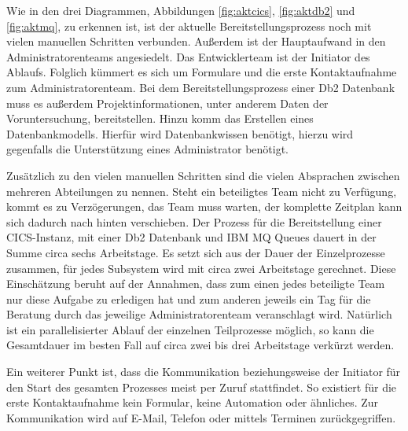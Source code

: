 Wie in den drei Diagrammen, Abbildungen \ref{fig:aktcics}, \ref{fig:aktdb2} und \ref{fig:aktmq}, zu erkennen ist, ist der aktuelle Bereitstellungsprozess noch mit vielen manuellen Schritten verbunden.
Außerdem ist der Hauptaufwand in den Administratorenteams angesiedelt.
Das Entwicklerteam ist der Initiator des Ablaufs.
Folglich kümmert es sich um Formulare und die erste Kontaktaufnahme zum Administratorenteam.
Bei dem Bereitstellungsprozess einer Db2 Datenbank muss es außerdem Projektinformationen, unter anderem Daten der Voruntersuchung, bereitstellen.
Hinzu komm das Erstellen eines Datenbankmodells.
Hierfür wird Datenbankwissen benötigt, hierzu wird gegenfalls die Unterstützung eines Administrator benötigt.

Zusätzlich zu den vielen manuellen Schritten sind die vielen Absprachen zwischen mehreren Abteilungen zu nennen.
Steht ein beteiligtes Team nicht zu Verfügung, kommt es zu Verzögerungen, das Team muss warten, der komplette Zeitplan kann sich dadurch nach hinten verschieben.
Der Prozess für die Bereitstellung einer CICS-Instanz, mit einer Db2 Datenbank und IBM MQ Queues dauert in der Summe circa sechs Arbeitstage.
Es setzt sich aus der Dauer der Einzelprozesse zusammen, für jedes Subsystem wird mit circa zwei Arbeitstage gerechnet.
Diese Einschätzung beruht auf der Annahmen, dass zum einen jedes beteiligte Team nur diese Aufgabe zu erledigen hat und zum anderen jeweils ein Tag für die Beratung durch das jeweilige Administratorenteam veranschlagt wird.
Natürlich ist ein parallelisierter Ablauf der einzelnen Teilprozesse möglich, so kann die Gesamtdauer im besten Fall auf circa zwei bis drei Arbeitstage verkürzt werden.

Ein weiterer Punkt ist, dass die Kommunikation beziehungsweise der Initiator für den Start des gesamten Prozesses meist per Zuruf stattfindet.
So existiert für die erste Kontaktaufnahme kein Formular, keine Automation oder ähnliches.
Zur Kommunikation wird auf E-Mail, Telefon oder mittels Terminen zurückgegriffen.


 
